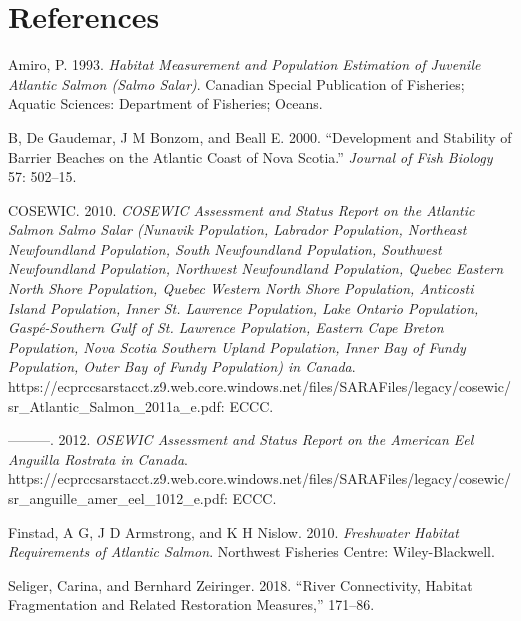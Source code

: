 \documentclass[
  letterpaper,
  DIV=11,
  numbers=noendperiod]{scrreprt}
\newlength{\cslhangindent}
\newenvironment{CSLReferences}[2] %
 {\begin{list}{}{%
  \setlength{\itemindent}{0pt}
  \setlength{\leftmargin}{0pt}
  \setlength{\parsep}{0pt}
  \ifodd #1
   \setlength{\leftmargin}{\cslhangindent}
   \setlength{\itemindent}{-1\cslhangindent}
  \fi
  \setlength{\itemsep}{#2\baselineskip}}}
 {\end{list}}
\begin{document}

\chapter*{References}\label{references}


\label{refs}
\begin{CSLReferences}{1}{0}
Amiro, P. 1993. \emph{Habitat Measurement and Population Estimation of
Juvenile Atlantic Salmon (Salmo Salar)}. Canadian Special Publication of
Fisheries; Aquatic Sciences: Department of Fisheries; Oceans.

B, De Gaudemar, J M Bonzom, and Beall E. 2000. {``Development and
Stability of Barrier Beaches on the Atlantic Coast of Nova Scotia.''}
\emph{Journal of Fish Biology} 57: 502--15.

COSEWIC. 2010. \emph{COSEWIC Assessment and Status Report on the
Atlantic Salmon Salmo Salar (Nunavik Population, Labrador Population,
Northeast Newfoundland Population, South Newfoundland Population,
Southwest Newfoundland Population, Northwest Newfoundland Population,
Quebec Eastern North Shore Population, Quebec Western North Shore
Population, Anticosti Island Population, Inner St. Lawrence Population,
Lake Ontario Population, Gaspé-Southern Gulf of St. Lawrence Population,
Eastern Cape Breton Population, Nova Scotia Southern Upland Population,
Inner Bay of Fundy Population, Outer Bay of Fundy Population) in
Canada}.
https://ecprccsarstacct.z9.web.core.windows.net/files/SARAFiles/legacy/cosewic/sr\_Atlantic\_Salmon\_2011a\_e.pdf:
ECCC.

---------. 2012. \emph{OSEWIC Assessment and Status Report on the
American Eel Anguilla Rostrata in Canada}.
https://ecprccsarstacct.z9.web.core.windows.net/files/SARAFiles/legacy/cosewic/sr\_anguille\_amer\_eel\_1012\_e.pdf:
ECCC.

Finstad, A G, J D Armstrong, and K H Nislow. 2010. \emph{Freshwater
Habitat Requirements of Atlantic Salmon}. Northwest Fisheries Centre:
Wiley-Blackwell.

Seliger, Carina, and Bernhard Zeiringer. 2018. {``River Connectivity,
Habitat Fragmentation and Related Restoration Measures,''} 171--86.

\end{CSLReferences}
\end{document}
